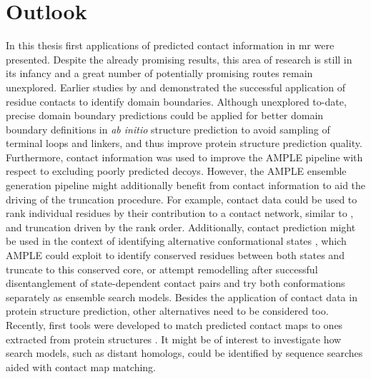 \section{Outlook}
In this thesis first applications of predicted contact information in \gls{mr} were presented. Despite the already promising results, this area of research is still in its infancy and a great number of potentially promising routes remain unexplored. Earlier studies by \textcite{Rigden2002-mf} and \textcite{Sadowski2013-zu} demonstrated the successful application of residue contacts to identify domain boundaries. Although unexplored to-date, precise domain boundary predictions could be applied for better domain boundary definitions in \textit{ab initio} structure prediction to avoid sampling of terminal loops and linkers, and thus improve protein structure prediction quality. Furthermore, contact information was used to improve the AMPLE pipeline with respect to excluding poorly predicted decoys. However, the AMPLE ensemble generation pipeline might additionally benefit from contact information to aid the driving of the truncation procedure. For example, contact data could be used to rank individual residues by their contribution to a contact network, similar to \cite{Parente2015-mv}, and truncation driven by the rank order. Additionally, contact prediction might be used in the context of identifying alternative conformational states \cite{Hopf2012-zl,Jana2014-rw,Sfriso2016-ml,Morcos2013-ks, Sutto2015-ck}, which AMPLE could exploit to identify conserved residues between both states and truncate to this conserved core, or attempt remodelling after successful disentanglement of state-dependent contact pairs and try both conformations separately as ensemble search models. Besides the application of contact data in protein structure prediction, other alternatives need to be considered too. Recently, first tools were developed to match predicted contact maps to ones extracted from protein structures \cite{Buchan2017-ox,Ovchinnikov2017-nd}. It might be of interest to investigate how search models, such as distant homologs, could be identified by sequence searches aided with contact map matching. 
